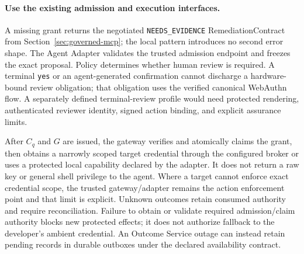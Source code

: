 \paragraph{Use the existing admission and execution interfaces.}
A missing grant returns the negotiated \texttt{NEEDS\_EVIDENCE} RemediationContract from Section~\ref{sec:governed-mcp}; the local pattern introduces no second error shape. The Agent Adapter validates the trusted admission endpoint and freezes the exact proposal. Policy determines whether human review is required. A terminal \texttt{yes} or an agent-generated confirmation cannot discharge a hardware-bound review obligation; that obligation uses the verified canonical WebAuthn flow. A separately defined terminal-review profile would need protected rendering, authenticated reviewer identity, signed action binding, and explicit assurance limits.

After $C_q$ and $G$ are issued, the gateway verifies and atomically claims the grant, then obtains a narrowly scoped target credential through the configured broker or uses a protected local capability declared by the adapter. It does not return a raw key or general shell privilege to the agent. Where a target cannot enforce exact credential scope, the trusted gateway/adapter remains the action enforcement point and that limit is explicit. Unknown outcomes retain consumed authority and require reconciliation. Failure to obtain or validate required admission/claim authority blocks new protected effects; it does not authorize fallback to the developer's ambient credential. An Outcome Service outage can instead retain pending records in durable outboxes under the declared availability contract.

